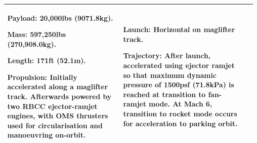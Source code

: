 {\begin{landscape}
\begin{xltabular}{\linewidth}{|X|X|X|}
			\textbf{Payload:} 20,000lbs (9071.8kg).
			
			\textbf{Mass:} 597,250lbs (270,908.0kg).
			
			\textbf{Length:} 171ft (52.1m). 
			
			\textbf{Propulsion:} Initially accelerated along a maglifter track. Afterwards powered by two RBCC ejector-ramjet engines, with OMS thrusters used for circularisation and manoeuvring on-orbit. 
			
			&\small
			\textbf{Launch:} Horizontal on maglifter track. 
			
			\textbf{Trajectory:} After launch, accelerated using ejector ramjet so that maximum dynamic pressure of 1500psf (71.8kPa) is reached at transition to fan-ramjet mode. 
			At Mach 6, transition to rocket mode occurs for acceleration to parking orbit.\\ 
			
			\hline 
		\end{xltabular} 
		
	\end{landscape}
}

